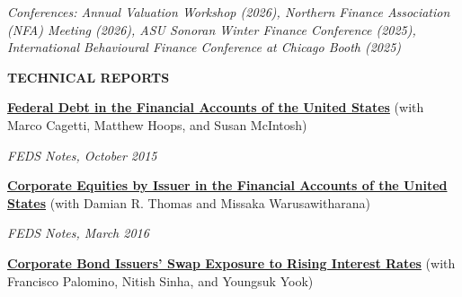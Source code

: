 \documentclass[11pt]{article}
\begin{document}
\textit{Conferences: Annual Valuation Workshop (2026), Northern Finance Association (NFA) Meeting (2026), ASU Sonoran Winter Finance Conference (2025), International Behavioural Finance Conference at Chicago Booth (2025)}




\vspace{.15in}

\textbf{T{\scriptsize ECHNICAL} R{\scriptsize EPORTS}}

\vspace{.1in}

\textbf{\href{https://www.federalreserve.gov/econresdata/notes/feds-notes/2015/federal-debt-in-the-financial-accounts-of-the-united-states-20151008.html}{Federal Debt in the Financial Accounts of the United States}} (with Marco Cagetti, Matthew Hoops, and Susan McIntosh)

\textit{FEDS Notes, October 2015}

\vspace{.1in}

\textbf{\href{https://www.federalreserve.gov/econresdata/notes/feds-notes/2016/corporate-equities-by-issuer-in-the-financial-accounts-of-the-united-states-20160329.html}{Corporate Equities by Issuer in the Financial Accounts of the United States}} (with Damian R. Thomas and Missaka Warusawitharana)

\textit{FEDS Notes, March 2016}

\vspace{.1in}

\textbf{\href{https://www.federalreserve.gov/econresdata/notes/feds-notes/2016/corporate-bond-issuers-swap-exposure-to-rising-interest-rates-20160526.html}{Corporate Bond Issuers' Swap Exposure to Rising Interest Rates}} (with Francisco Palomino, Nitish Sinha, and Youngsuk Yook)
\end{document}
